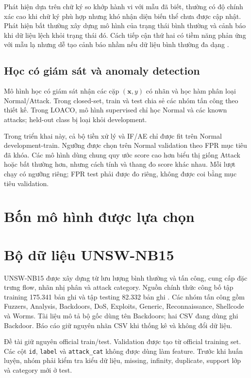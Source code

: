 \documentclass[12pt,a4paper,oneside]{report}
\begin{document}
Phát hiện dựa trên chữ ký so khớp hành vi với mẫu đã biết, thường có độ chính xác cao khi chữ ký phù hợp nhưng khó nhận diện biến thể chưa được cập nhật. Phát hiện bất thường xây dựng mô hình của trạng thái bình thường và cảnh báo khi dữ liệu lệch khỏi trạng thái đó. Cách tiếp cận thứ hai có tiềm năng phản ứng với mẫu lạ nhưng dễ tạo cảnh báo nhầm nếu dữ liệu bình thường đa dạng \cite{chandola2009}.

\subsection{Học có giám sát và anomaly detection}

Mô hình học có giám sát nhận các cặp $(\mathbf{x},y)$ có nhãn và học hàm phân loại Normal/Attack. Trong closed-set, train và test chia sẻ các nhóm tấn công theo thiết kế. Trong LOACO, mô hình supervised chỉ học Normal và các known attacks; held-out class bị loại khỏi development.

Trong triển khai này, cả bộ tiền xử lý và IF/AE chỉ được fit trên Normal development-train. Ngưỡng được chọn trên Normal validation theo FPR mục tiêu đã khóa. Các mô hình dùng chung quy ước score cao hơn biểu thị giống Attack hoặc bất thường hơn, nhưng cách tính và thang đo score khác nhau. Mỗi lượt chạy có ngưỡng riêng; FPR test phải được đo riêng, không được coi bằng mục tiêu validation.

\section{Bốn mô hình được lựa chọn}


\section{Bộ dữ liệu UNSW-NB15}

UNSW-NB15 được xây dựng từ lưu lượng bình thường và tấn công, cung cấp đặc trưng flow, nhãn nhị phân và attack category. Nguồn chính thức công bố tập training 175.341 bản ghi và tập testing 82.332 bản ghi \cite{unswsite,moustafa2015}. Các nhóm tấn công gồm Fuzzers, Analysis, Backdoors, DoS, Exploits, Generic, Reconnaissance, Shellcode và Worms. Tài liệu mô tả bộ gốc dùng tên Backdoors; hai CSV đang dùng ghi Backdoor. Báo cáo giữ nguyên nhãn CSV khi thống kê và không đổi dữ liệu.

Đề tài giữ nguyên official train/test. Validation được tạo từ official training set. Các cột \texttt{id}, \texttt{label} và \texttt{attack\_cat} không được dùng làm feature. Trước khi huấn luyện, nhóm phải kiểm tra kiểu dữ liệu, missing, infinity, duplicate, support lớp và category mới ở test.
\end{document}
